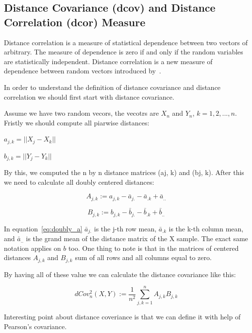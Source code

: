 \subsection{Distance Covariance (dcov) and Distance Correlation  (dcor) Measure}
\label{sec:dcov-dcor}
Distance correlation is a measure of statistical dependence between two vectors of arbitrary. The measure of dependence is zero if and only if the random variables are statistically independent. Distance correlation is a new measure of dependence between random vectors introduced by~\cite{Szekely2009}.

In order to understand the definition of distance covariance and distance correlation we should first start with distance covariance.

Assume we have two random vecors, the vecotrs are $X_n$ and $Y_n$, $k=1,2,...,n$. Fristly we should compute all piarwise distances:

$a_{j,k} = ||X_j - X_k||$

$b_{j,k} = ||Y_j - Y_k||$

By this, we computed the n by n distance matrices (aj, k) and (bj, k). After this we need to calculate all doubly centered distances:

\begin{equation}
\label{eq:doubly_a}
A_{j,k} := a_{j,k} - \bar{a}_{j.} - \bar{a}_{.k} + \bar{a}_{..}
\end{equation}

\begin{equation}
\label{eq:doubly_b}
B_{j,k} := b_{j,k} - \bar{b}_{j.} - \bar{b}_{.k} + \bar{b}_{..}
\end{equation}

In equation~\ref{eq:doubly_a} $\bar{a}_{j.}$ is the j-th row mean, $\bar{a}_{.k}$ is the k-th column mean, and $\bar{a}_{..}$ is the grand mean of the distance matrix of the X sample. The exact same notation applies on $b$ too. One thing to note is that in the matrices of centered distances $A_{j, k}$ and $B_{j,k}$  sum of all rows and all columns equal to zero.

By having all of these value we can calculate the distance covariance like this:

\begin{equation}
\label{eq:distance_covariance}
dCov_n^2 (X, Y) := \frac{1}{n^2} \sum_{j,k=1}^{n} A_{j,k}B_{j,k}
\end{equation}

Interesting point about distance coveriance is that we can define it with help of Pearson’s covariance.




